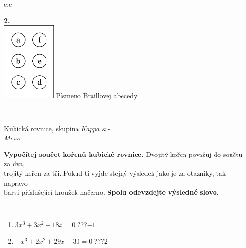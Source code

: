 \documentclass[10pt]{report}
\begin{document}
\begin{tabular}{c:c}
\begin{minipage}[c][104.5mm][t]{0.5\linewidth}
\begin{center}
\begin{minipage}{0.79\linewidth}
\begin{center}
\begin{varwidth}{\linewidth}
\begin{enumerate}
\end{enumerate}
\end{varwidth}
\end{center}
\end{minipage}
\begin{minipage}{0.20\linewidth}
\begin{center}
{\Huge\bfseries 2.} \\[2mm]
\includegraphics[height=40mm]{../images/braille.png}
{\small Písmeno Braillovej abecedy}
\end{center}
\end{minipage}
\end{center}
\end{minipage}
\\ \hdashline
\begin{minipage}[c][104.5mm][t]{0.5\linewidth}
\begin{center}
\vspace{7mm}
{\huge Kubická rovnice, skupina \textit{Kappa $\kappa$} -}\\[5mm]
\textit{Meno:}\phantom{xxxxxxxxxxxxxxxxxxxxxxxxxxxxxxxxxxxxxxxxxxxxxxxxxxxxxxxxxxxxxxxxx}\\[5mm]
\begin{minipage}{0.95\linewidth}
\textbf{Vypočítej součet kořenů kubické rovnice.} Dvojitý kořen považuj do součtu za dva,\\trojitý kořen za tři. Pokud ti vyjde stejný výsledek jako je za otazníky, tak napravo\\barvi příslušející kroužek načerno. \textbf{Spolu odevzdejte výsledné slovo}.
\end{minipage}
\\[1mm]
\begin{minipage}{0.79\linewidth}
\begin{center}
\begin{varwidth}{\linewidth}
\begin{enumerate}
\Large
\item $3x^3+3x^2-18x=0$\quad \dotfill\; ???\;\dotfill \quad $-1$
\item $-x^3+2x^2+29x-30=0$\quad \dotfill\; ???\;\dotfill \quad $2$

\end{enumerate}
\end{varwidth}
\end{center}
\end{minipage}
\end{center}
\end{minipage}
\end{tabular}
\end{document}
